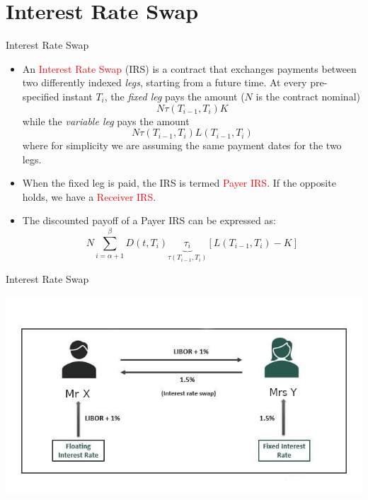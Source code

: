 \documentclass{beamer}
\begin{document}
\section{Interest Rate Swap}
\begin{frame}{Interest Rate Swap}
	\begin{itemize}
		\item An \textcolor{red}{Interest Rate Swap} (IRS) is a contract that exchanges payments between two differently indexed \emph{legs}, starting from a future time. At every pre-specified instant $T_i$, the \emph{fixed leg} pays the amount ($N$ is the contract nominal)
		\begin{equation*}
			N\tau(T_{i-1}, T_i)K
		\end{equation*}
		while the \emph{variable leg} pays the amount
		\begin{equation*}
			N\tau(T_{i-1}, T_i)L(T_{i-1}, T_i)
		\end{equation*}
		where for simplicity we are assuming the same payment dates for the two legs.
		\item<2-> When the fixed leg is paid, the IRS is termed \textcolor{red}{Payer IRS}. If the opposite holds, we have a \textcolor{red}{Receiver IRS}.
		\item<3-> The discounted payoff of a Payer IRS can be expressed as:
		\begin{equation}
			N\sum_{i=\alpha+1}^{\beta} D(t,T_i) \underbrace{\tau_i}_{\tau(T_{i-1},T_i)}
			\left[L(T_{i-1},T_i)-K\right]
			\label{eq:payoff_payer_irs}
		\end{equation}	
	\end{itemize}
\end{frame}

\begin{frame}{Interest Rate Swap}
\begin{center}
	\includegraphics[width=0.9\linewidth]{Interest-Rate-Swap-diagram}
\end{center}
\end{frame}
\end{document}
